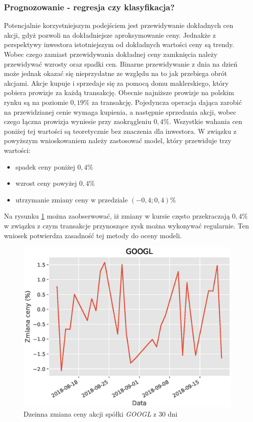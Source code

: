 \documentclass[a4paper, twoside, 11pt, openright]{article}
\begin{document}
\subsubsection{Prognozowanie - regresja czy klasyfikacja?}

Potencjalnie korzystniejszym podejściem jest przewidywanie dokładnych cen akcji, gdyż pozwoli na dokładniejsze aproksymowanie ceny. Jednakże z perspektywy inwestora istotniejszym od dokładnych wartości ceny są trendy. Wobec czego zamiast przewidywania dokładnej ceny zamknięcia należy przewidywać wzrosty oraz spadki cen. Binarne przewidywanie z dnia na dzień może jednak okazać się nieprzydatne ze względu na to jak przebiega obrót akcjami. Akcje kupuje i sprzedaje się za pomocą domu maklerskiego, który pobiera prowizje za każdą transakcję. Obecnie najniższe prowizje na polskim rynku są na poziomie $0,19\%$ za transakcję. Pojedyncza operacja dająca zarobić na przewidzianej cenie wymaga kupienia, a następnie sprzedania akcji, wobec czego łączna prowizja wyniesie przy zaokrągleniu $0,4\%$. Wszystkie wahania cen poniżej tej wartości są teoretycznie bez znaczenia dla inwestora. W związku z powyższym wnioskowaniem należy zastosować model, który przewiduje trzy wartości:
\begin{itemize}
\item spadek ceny poniżej $0,4\%$
\item wzrost ceny powyżej $0,4\%$
\item utrzymanie zmiany ceny w przedziale $(-0,4; 0,4)\%$
\end{itemize}


Na rysunku \ref{l_r_pct_change_last_30} można zaobserwować, iż zmiany w kursie często przekraczają $0,4\%$ w związku z czym transakcje przynoszące zysk można wykonywać regularnie. Ten wniosek potwierdza zasadność tej metody do oceny modeli.

\begin{figure}[H]
\centering \includegraphics[scale=0.9]{img/linear_regression/l_r_pct_change_last_30}
\caption{Dzeinna zmiana ceny akcji spółki \textit{GOOGL} z 30 dni}
\label{l_r_pct_change_last_30}
\end{figure}
\end{document}
